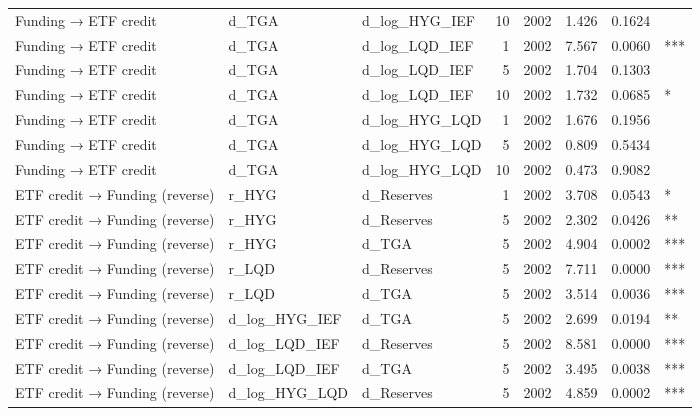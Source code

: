 \begin{table}[htbp]
\begin{tabular}{lllrrrrl}
  Funding → ETF credit & d\_TGA & d\_log\_HYG\_IEF & 10 & 2002 & 1.426 & 0.1624 &     \\ 
  Funding → ETF credit & d\_TGA & d\_log\_LQD\_IEF & 1 & 2002 & 7.567 & 0.0060 & *** \\ 
  Funding → ETF credit & d\_TGA & d\_log\_LQD\_IEF & 5 & 2002 & 1.704 & 0.1303 &     \\ 
  Funding → ETF credit & d\_TGA & d\_log\_LQD\_IEF & 10 & 2002 & 1.732 & 0.0685 &   * \\ 
  Funding → ETF credit & d\_TGA & d\_log\_HYG\_LQD & 1 & 2002 & 1.676 & 0.1956 &     \\ 
  Funding → ETF credit & d\_TGA & d\_log\_HYG\_LQD & 5 & 2002 & 0.809 & 0.5434 &     \\ 
  Funding → ETF credit & d\_TGA & d\_log\_HYG\_LQD & 10 & 2002 & 0.473 & 0.9082 &     \\ 
  ETF credit → Funding (reverse) & r\_HYG & d\_Reserves & 1 & 2002 & 3.708 & 0.0543 &   * \\ 
  ETF credit → Funding (reverse) & r\_HYG & d\_Reserves & 5 & 2002 & 2.302 & 0.0426 &  ** \\ 
  ETF credit → Funding (reverse) & r\_HYG & d\_TGA & 5 & 2002 & 4.904 & 0.0002 & *** \\ 
  ETF credit → Funding (reverse) & r\_LQD & d\_Reserves & 5 & 2002 & 7.711 & 0.0000 & *** \\ 
  ETF credit → Funding (reverse) & r\_LQD & d\_TGA & 5 & 2002 & 3.514 & 0.0036 & *** \\ 
  ETF credit → Funding (reverse) & d\_log\_HYG\_IEF & d\_TGA & 5 & 2002 & 2.699 & 0.0194 &  ** \\ 
  ETF credit → Funding (reverse) & d\_log\_LQD\_IEF & d\_Reserves & 5 & 2002 & 8.581 & 0.0000 & *** \\ 
  ETF credit → Funding (reverse) & d\_log\_LQD\_IEF & d\_TGA & 5 & 2002 & 3.495 & 0.0038 & *** \\ 
  ETF credit → Funding (reverse) & d\_log\_HYG\_LQD & d\_Reserves & 5 & 2002 & 4.859 & 0.0002 & *** \\ 
   \bottomrule
\end{tabular}
\end{table}
